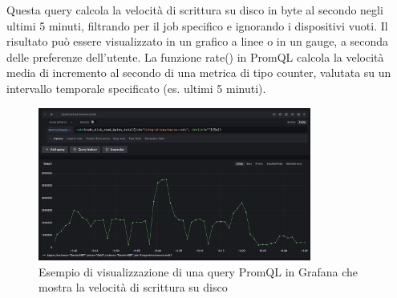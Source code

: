 Questa query calcola la velocità di scrittura su disco in byte al secondo negli ultimi 5 minuti, filtrando per il job specifico e ignorando i dispositivi vuoti. Il risultato può essere visualizzato in un grafico a linee o in un gauge, a seconda delle preferenze dell'utente.
La funzione rate() in PromQL calcola la velocità media di incremento al secondo di una metrica di tipo counter, valutata su un intervallo temporale specificato (es. ultimi 5 minuti).

\begin{figure}[h]
    \centering
    \includegraphics[width=0.8\textwidth]{img/rate-function.png}
    \caption{Esempio di visualizzazione di una query PromQL in Grafana che mostra la velocità di scrittura su disco}
    \label{fig:rate_function_example}
\end{figure}


